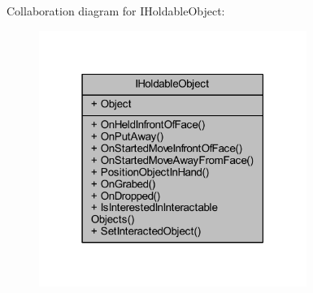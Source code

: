 Collaboration diagram for I\+Holdable\+Object\+:
\nopagebreak
\begin{figure}[H]
\begin{center}
\leavevmode
\includegraphics[width=247pt]{interface_i_holdable_object__coll__graph}
\end{center}
\end{figure}
